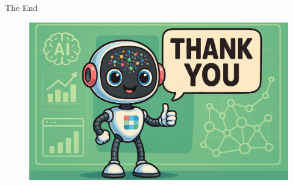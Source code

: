 \begin{frame}{The End}
    \vspace{-.15cm}

    \begin{figure}[htbp]
        \centering
        \includegraphics[width=\textwidth]{../img/thankyou-final.png}
    \end{figure}
\end{frame}